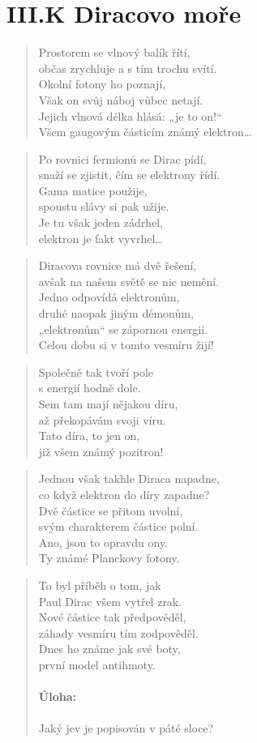 \documentclass{../../../../style/mkimain}
\begin{document}
\section*{III.K Diracovo moře}
\begin{verse}
Prostorem se vlnový balík řítí,\\
občas zrychluje a s tím trochu svítí.\\
Okolní fotony ho poznají,\\
Však on svůj náboj vůbec netají.\\
Jejich vlnová délka hlásá: „je to on!“\\
Všem gaugovým částicím známý elektron…
\end{verse}
\begin{verse}
Po rovnici fermionů se Dirac pídí,\\
snaží se zjistit, čím se elektrony řídí.\\
Gama matice použije,\\
spoustu slávy si pak užije.\\
Je tu však jeden zádrhel,\\
elektron je fakt vyvrhel…
\end{verse}
\begin{verse}
Diracova rovnice má dvě řešení,\\
avšak na našem světě se nic nemění.\\
Jedno odpovídá elektronům,\\
druhé naopak jiným démonům,\\
„elektronům“ se zápornou energií.\\
Celou dobu si v tomto vesmíru žijí!
\end{verse}
\begin{verse}
Společně tak tvoří pole\\
s energií hodně dole.\\
Sem tam mají nějakou díru,\\
až překopávám svoji víru.\\
Tato díra, to jen on,\\
již všem známý pozitron!
\end{verse}
\begin{verse}
Jednou však takhle Diraca napadne,\\
co když elektron do díry zapadne?\\
Dvě částice se přitom uvolní,\\
svým charakterem částice polní.\\
Ano, jsou to opravdu ony.\\
Ty známé Planckovy fotony.
\end{verse}
\begin{verse}
To byl příběh o tom, jak\\
Paul Dirac všem vytřel zrak.\\
Nové částice tak předpověděl,\\
záhady vesmíru tím zodpověděl.\\
Dnes ho známe jak své boty,\\
první model antihmoty.
\\
\\
\textbf{Úloha:}
\\
\\
Jaký jev je popisován v páté sloce?
\end{verse}
\end{document}
